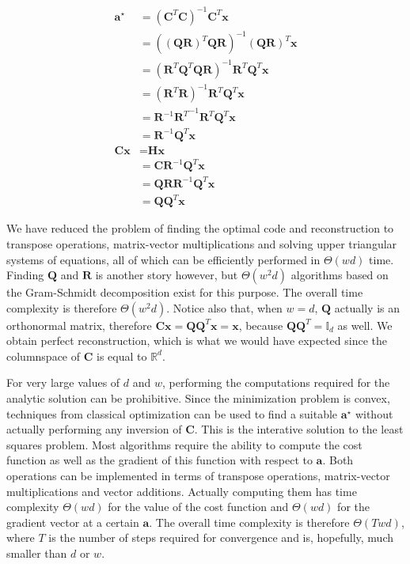 \documentclass[12pt,a4paper,oneside,english]{UPBThesis}
\newcommand{\hcsignalspace}{\mathbb{R}^d}
\begin{document}
\begin{align*}
\textbf{a}^\star & = (\textbf{C}^T\textbf{C})^{-1}\textbf{C}^T\textbf{x} \\
& = ((\textbf{Q}\textbf{R})^T\textbf{Q}\textbf{R})^{-1}(\textbf{Q}\textbf{R})^T\textbf{x} \\
& = (\textbf{R}^T\textbf{Q}^T\textbf{Q}\textbf{R})^{-1}\textbf{R}^T\textbf{Q}^T\textbf{x} \\
& = (\textbf{R}^T\textbf{R})^{-1}\textbf{R}^T\textbf{Q}^T\textbf{x} \\
& = \textbf{R}^{-1}{\textbf{R}^T}^{-1}\textbf{R}^T\textbf{Q}^T\textbf{x} \\
& = \textbf{R}^{-1}\textbf{Q}^T\textbf{x} \\
\textbf{C}\textbf{x} & = \textbf{H}\textbf{x} \\
& = \textbf{C}\textbf{R}^{-1}\textbf{Q}^T\textbf{x} \\
& = \textbf{Q}\textbf{R}\textbf{R}^{-1}\textbf{Q}^T\textbf{x} \\
& = \textbf{Q}\textbf{Q}^T\textbf{x}
\end{align*}

We have reduced the problem of finding the optimal code and reconstruction to transpose operations, matrix-vector multiplications and solving upper triangular systems of equations, all of which can be efficiently performed in $\Theta(wd)$ time. Finding $\textbf{Q}$ and $\textbf{R}$ is another story however, but $\Theta(w^2d)$ algorithms based on the Gram-Schmidt decomposition exist for this purpose. The overall time complexity is therefore $\Theta(w^2d)$. Notice also that, when $w = d$, $\textbf{Q}$ actually is an orthonormal matrix, therefore $\textbf{C}\textbf{x} = \textbf{Q}\textbf{Q}^T\textbf{x} = \textbf{x}$, because $\textbf{Q}\textbf{Q}^T = \mathbb{I}_d$ as well. We obtain perfect reconstruction, which is what we would have expected since the columnspace of $\textbf{C}$ is equal to $\hcsignalspace$.

For very large values of $d$ and $w$, performing the computations required for the analytic solution can be prohibitive. Since the minimization problem is convex, techniques from classical optimization can be used to find a suitable $\textbf{a}^\star$ without actually performing any inversion of $\textbf{C}$. This is the interative solution to the least squares problem. Most algorithms require the ability to compute the cost function as well as the gradient of this function with respect to $\textbf{a}$. Both operations can be implemented in terms of transpose operations, matrix-vector multiplications and vector additions. Actually computing them has time complexity $\Theta(wd)$ for the value of the cost function and $\Theta(wd)$ for the gradient vector at a certain $\textbf{a}$. The overall time complexity is therefore $\Theta(Twd)$, where $T$ is the number of steps required for convergence and is, hopefully, much smaller than $d$ or $w$.
\end{document}
